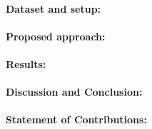 \documentclass[12pt]{report}
\begin{document}
	
	
	\paragraph{Dataset and setup:}
	
	
	
	\paragraph{Proposed approach:}
	
	
	
	\paragraph{Results:}
	
	

	\paragraph{Discussion and Conclusion:}
	
	
	
	\paragraph{Statement of Contributions:}
	
\end{document}
